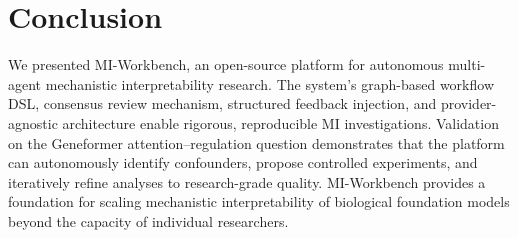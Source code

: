 \documentclass[11pt,a4paper]{article}
\begin{document}

\section{Conclusion}
\label{sec:conclusion}

We presented MI-Workbench, an open-source platform for autonomous multi-agent mechanistic interpretability research.
The system's graph-based workflow DSL, consensus review mechanism, structured feedback injection, and provider-agnostic architecture enable rigorous, reproducible MI investigations.
Validation on the Geneformer attention--regulation question demonstrates that the platform can autonomously identify confounders, propose controlled experiments, and iteratively refine analyses to research-grade quality.
MI-Workbench provides a foundation for scaling mechanistic interpretability of biological foundation models beyond the capacity of individual researchers.



\end{document}

